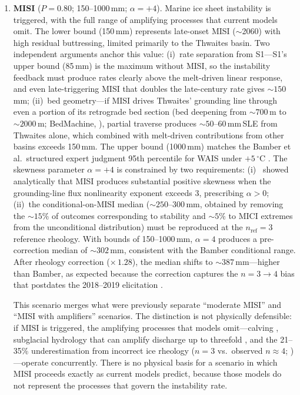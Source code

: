 \documentclass[11pt]{article}
\begin{document}
\begin{enumerate}
	\item[\textbf{S2.}] \textbf{MISI} ($P = 0.80$; 150--1000\,mm; $\alpha = +4$). Marine ice sheet instability is triggered, with the full range of amplifying processes that current models omit. The lower bound (150\,mm) represents late-onset MISI ($\sim$2060) with high residual buttressing, limited primarily to the Thwaites basin. Two independent arguments anchor this value: (i)~rate separation from S1---S1's upper bound (85\,mm) is the maximum without MISI, so the instability feedback must produce rates clearly above the melt-driven linear response, and even late-triggering MISI that doubles the late-century rate gives $\sim\!150$\,mm; (ii)~bed geometry---if MISI drives Thwaites' grounding line through even a portion of its retrograde bed section (bed deepening from $\sim\!700$\,m to $\sim\!2000$\,m; BedMachine, \citealp{Morlighem2020}), partial traverse produces $\sim\!50$--60\,mm\,SLE from Thwaites alone, which combined with melt-driven contributions from other basins exceeds 150\,mm. The upper bound (1000\,mm) matches the Bamber et al.\ structured expert judgment 95th percentile for WAIS under $+5\,^\circ$C \citep[$\sim\!930$\,mm;][]{Bamber2019}. The skewness parameter $\alpha = +4$ is constrained by two requirements: (i)~\citet{Robel2019} showed analytically that MISI produces substantial positive skewness when the grounding-line flux nonlinearity exponent exceeds 3, prescribing $\alpha > 0$; (ii)~the \citet{Bamber2019} conditional-on-MISI median ($\sim\!250$--300\,mm, obtained by removing the $\sim\!15\%$ of outcomes corresponding to stability and $\sim\!5\%$ to MICI extremes from the unconditional distribution) must be reproduced at the $n_{\mathrm{ref}} = 3$ reference rheology. With bounds of 150--1000\,mm, $\alpha = 4$ produces a pre-correction median of $\sim\!302$\,mm, consistent with the Bamber conditional range. After rheology correction ($\times\,1.28$), the median shifts to $\sim\!387$\,mm---higher than Bamber, as expected because the correction captures the $n = 3 \to 4$ bias that postdates the 2018--2019 elicitation \citep{Millstein2022, Martin2026}.

	This scenario merges what were previously separate ``moderate MISI'' and ``MISI with amplifiers'' scenarios. The distinction is not physically defensible: if MISI is triggered, the amplifying processes that models omit---calving \citep{Aschwanden2021, Fricker2025}, subglacial hydrology that can amplify discharge up to threefold \citep{Dow2022}, and the 21--35\% underestimation from incorrect ice rheology ($n = 3$ vs.\ observed $n \approx 4$; \citealp{Martin2026, GetraerMorlighem2025})---operate concurrently. There is no physical basis for a scenario in which MISI proceeds exactly as current models predict, because those models do not represent the processes that govern the instability rate.


\end{enumerate}
\end{document}
